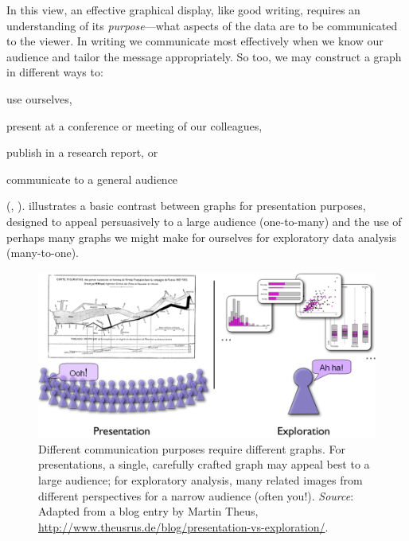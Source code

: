 \documentclass[11pt]{book}\usepackage[]{graphicx}\usepackage[]{color}
\begin{document}
In this view,
an effective graphical display, like good writing, requires an
understanding of its \emph{purpose}---what aspects of the data are to be
communicated to the viewer.  In writing we communicate most
effectively when we know our audience and tailor the message
appropriately. So too, we may construct a graph in different ways to:
\begin{seriate}
  \item use ourselves, 
  \item present at a conference or meeting of our colleagues, 
  \item publish in a research report, or
  \item communicate to a general audience
\end{seriate}
(\citet[Ch. 1]{Friendly:91}, \citet{FriendlyKwan:2011}).
 illustrates a basic contrast between graphs
for presentation purposes, designed to appeal persuasively to a large audience
(one-to-many)
and the use of perhaps many graphs we might make for ourselves for 
exploratory data analysis (many-to-one).

\begin{figure}[htb]
\centering
\includegraphics[width=.8\textwidth]{ch01/fig/presentation-exploration2}
\caption[Different communication purposes require different graphs]{Different communication purposes require different graphs. For presentations, a single, carefully crafted graph may appeal best to a large audience; for exploratory analysis, many related images from different perspectives for a narrow audience (often you!). \emph{Source}: Adapted from a blog entry by Martin Theus, \url{http://www.theusrus.de/blog/presentation-vs-exploration/}.}\label{fig:presentation-exploration}
\end{figure}
\end{document}
